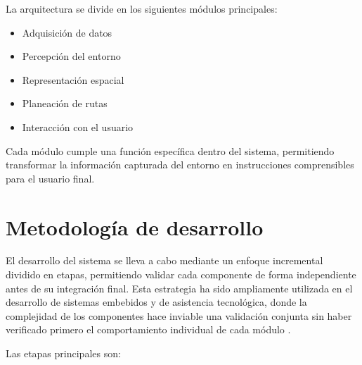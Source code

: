La arquitectura se divide en los siguientes módulos principales:

\begin{itemize}
    \item Adquisición de datos
    \item Percepción del entorno
    \item Representación espacial
    \item Planeación de rutas
    \item Interacción con el usuario
\end{itemize}

Cada módulo cumple una función específica dentro del sistema, permitiendo transformar la información capturada del entorno en instrucciones comprensibles para el usuario final.

\section{Metodología de desarrollo}

El desarrollo del sistema se lleva a cabo mediante un enfoque incremental dividido en etapas, permitiendo validar cada componente de forma independiente antes de su integración final. Esta estrategia ha sido ampliamente utilizada en el desarrollo de sistemas embebidos y de asistencia tecnológica, donde la complejidad de los componentes hace inviable una validación conjunta sin haber verificado primero el comportamiento individual de cada módulo \cite{pressman2014ingenieria}.

Las etapas principales son:


